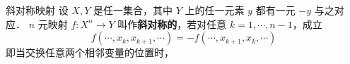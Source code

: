 

\begin{definition}{斜对称映射}
设 $X,Y$ 是任一集合，其中 $Y$ 上的任一元素 $y$ 都有一元 $-y$ 与之对应． $n$ 元映射 $f:X^n\rightarrow Y$ 叫作\textbf{斜对称的}，若对任意 $k=1,\cdots,n-1$，成立
\begin{equation}
f(\cdots,x_k,x_{k+1},\cdots)=-f(\cdots,x_{k+1},x_k,\cdots)
\end{equation}
即当交换任意两个相邻变量的位置时，
\end{definition}
